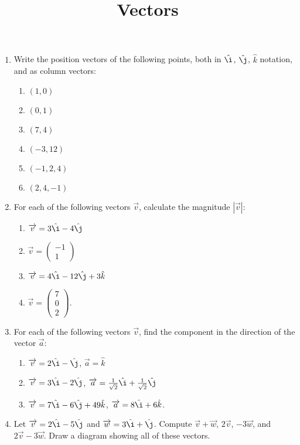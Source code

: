 \documentclass{article}
\newcommand{\ihat}{\hat{\i}}
\newcommand{\jhat}{\hat{\j}}
\newcommand{\khat}{\hat{k}}
\let\rarrow\overrightarrow
\begin{document}
\title{Vectors}
\date{}

\maketitle
\thispagestyle{empty}

\Large

\begin{enumerate}
	\item Write the position vectors of the following points, both in $\ihat$, $\jhat$, $\khat$ notation, and as column vectors:
		\begin{enumerate}
			\item $(1,0)$
			\item $(0,1)$
			\item $(7,4)$
			\item $(-3,12)$
			\item $(-1,2,4)$
			\item $(2,4,-1)$
		\end{enumerate}
	\item For each of the following vectors $\overrightarrow{v}$, calculate the magnitude $|\overrightarrow{v}|$:
		\begin{enumerate}
			\item $\rarrow{v}=3\ihat-4\jhat$
			\item $\rarrow{v}=\left(\begin{array}{c} -1\\1\end{array}\right)$
			\item $\rarrow{v}=4\ihat-12\jhat+3\khat$
			\item $\rarrow{v}=\left(\begin{array}{c} 7\\ 0 \\ 2\end{array}\right)$.
		\end{enumerate}
	\item For each of the following vectors $\rarrow{v}$, find the component in the direction of the vector $\rarrow{a}$:
		\begin{enumerate}
			\item $\rarrow{v}=2\ihat-\jhat$, $\rarrow{a}=\khat$
			\item $\rarrow{v}=3\ihat-2\jhat$, $\rarrow{a}=\frac{1}{\sqrt{2}}\ihat + \frac{1}{\sqrt{2}}\jhat$
			\item $\rarrow{v}=7\ihat-6\jhat+49\khat$, $\rarrow{a}=8\ihat+6\khat$.
		\end{enumerate}
	\item Let $\rarrow{v}=2\ihat-5\jhat$ and $\rarrow{w}=3\ihat+\jhat$. Compute $\rarrow{v}+\rarrow{w}$, $2\rarrow{v}$, $-3\rarrow{w}$, and $2\rarrow{v}-3\rarrow{w}$. Draw a diagram showing all of these vectors.

\end{enumerate}
\end{document}
